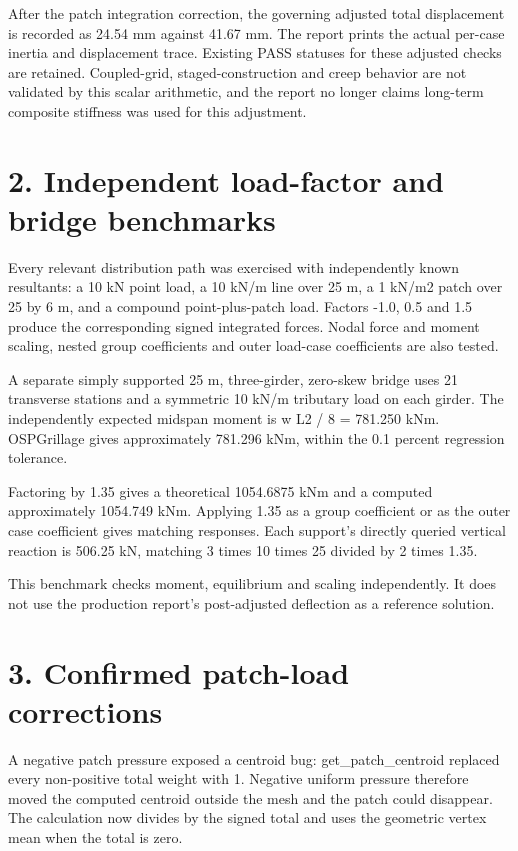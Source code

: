 \documentclass{article}%
\begin{document}
%
After the patch integration correction, the governing adjusted total displacement is recorded as 24.54 mm against 41.67 mm. The report prints the actual per{-}case inertia and displacement trace. Existing PASS statuses for these adjusted checks are retained. Coupled{-}grid, staged{-}construction and creep behavior are not validated by this scalar arithmetic, and the report no longer claims long{-}term composite stiffness was used for this adjustment.%

%
\section*{2. Independent load{-}factor and bridge benchmarks}%
\label{sec:2.Independentload{-}factorandbridgebenchmarks}%
Every relevant distribution path was exercised with independently known resultants: a 10 kN point load, a 10 kN/m line over 25 m, a 1 kN/m2 patch over 25 by 6 m, and a compound point{-}plus{-}patch load. Factors {-}1.0, 0.5 and 1.5 produce the corresponding signed integrated forces. Nodal force and moment scaling, nested group coefficients and outer load{-}case coefficients are also tested.%


%
A separate simply supported 25 m, three{-}girder, zero{-}skew bridge uses 21 transverse stations and a symmetric 10 kN/m tributary load on each girder. The independently expected midspan moment is w L2 / 8 = 781.250 kNm. OSPGrillage gives approximately 781.296 kNm, within the 0.1 percent regression tolerance.%


%
Factoring by 1.35 gives a theoretical 1054.6875 kNm and a computed approximately 1054.749 kNm. Applying 1.35 as a group coefficient or as the outer case coefficient gives matching responses. Each support's directly queried vertical reaction is 506.25 kN, matching 3 times 10 times 25 divided by 2 times 1.35.%


%
This benchmark checks moment, equilibrium and scaling independently. It does not use the production report's post{-}adjusted deflection as a reference solution.%

%
\section*{3. Confirmed patch{-}load corrections}%
\label{sec:3.Confirmedpatch{-}loadcorrections}%
A negative patch pressure exposed a centroid bug: get\_patch\_centroid replaced every non{-}positive total weight with 1. Negative uniform pressure therefore moved the computed centroid outside the mesh and the patch could disappear. The calculation now divides by the signed total and uses the geometric vertex mean when the total is zero.%
\end{document}
